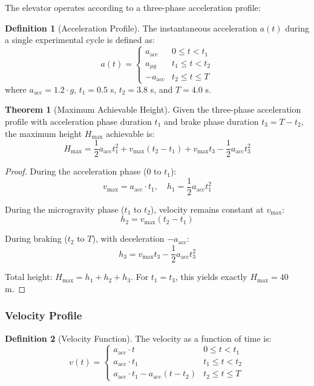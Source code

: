 ﻿\documentclass[a4paper,12pt]{article}
\theoremstyle{definition}
\newtheorem{definition}{Definition}
\newtheorem{theorem}{Theorem}
\begin{document}
The elevator operates according to a three-phase acceleration profile:

\begin{definition}[Acceleration Profile]
The instantaneous acceleration $a(t)$ during a single experimental cycle is defined as:
\[
a(t) = \begin{cases}
a_{\text{acc}} & 0 \leq t < t_1 \\
a_{\mu g} & t_1 \leq t < t_2 \\
-a_{\text{acc}} & t_2 \leq t \leq T
\end{cases}
\]
where $a_{\text{acc}} = 1.2 \cdot g$, $t_1 = 0.5$ s, $t_2 = 3.8$ s, and $T = 4.0$ s.
\end{definition}

\begin{theorem}[Maximum Achievable Height]
Given the three-phase acceleration profile with acceleration phase duration $t_1$ and brake phase duration $t_3 = T - t_2$, the maximum height $H_{\max}$ achievable is:
\[
H_{\max} = \frac{1}{2} a_{\text{acc}} t_1^2 + v_{\text{max}}(t_2 - t_1) + v_{\text{max}} t_3 - \frac{1}{2} a_{\text{acc}} t_3^2
\]
\end{theorem}

\begin{proof}
During the acceleration phase (0 to $t_1$):
\[
v_{\text{max}} = a_{\text{acc}} \cdot t_1, \quad h_1 = \frac{1}{2} a_{\text{acc}} t_1^2
\]

During the microgravity phase ($t_1$ to $t_2$), velocity remains constant at $v_{\text{max}}$:
\[
h_2 = v_{\text{max}}(t_2 - t_1)
\]

During braking ($t_2$ to $T$), with deceleration $-a_{\text{acc}}$:
\[
h_3 = v_{\text{max}} t_3 - \frac{1}{2} a_{\text{acc}} t_3^2
\]

Total height: $H_{\max} = h_1 + h_2 + h_3$. For $t_1 = t_3$, this yields exactly $H_{\max} = 40$ m. \qedhere
\end{proof}

\subsubsection{Velocity Profile}

\begin{definition}[Velocity Function]
The velocity as a function of time is:
\[
v(t) = \begin{cases}
a_{\text{acc}} \cdot t & 0 \leq t < t_1 \\
a_{\text{acc}} \cdot t_1 & t_1 \leq t < t_2 \\
a_{\text{acc}} \cdot t_1 - a_{\text{acc}} (t - t_2) & t_2 \leq t \leq T
\end{cases}
\]
\end{definition}
\end{document}
